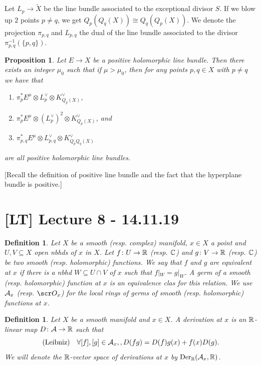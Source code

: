 \documentclass[A4paper, british, reqno]{amsart}
\theoremstyle{darkgreentheorem}
\newtheorem{prop}[thm]{Proposition}
\theoremstyle{darkbluedefinition}
\newtheorem{defn}[thm]{Definition}
\theoremstyle{darkredexample}
\theoremstyle{remark}
\DeclareMathOperator{\Der}{Der}
\newcommand{\1}{\mathbbm{1}}
\newcommand{\ot}{\otimes}
\newcommand{\dual}{^{\vee}}
\newcommand{\sub}{\subseteq}
\begin{document}
Let $L_{p}\to \tilde{X}$ be the line bundle associated to the exceptional divisor $S$.
If we blow up $2$ points $p\neq q$, we get $Q_{p}(Q_{q}(X))\cong Q_{q}(Q_{p}(X))$.
We denote the projection $\pi_{p,q}$ and $L_{p,q}$ the dual of the line bundle associated to the divisor $\pi_{p,q}^{-1}(\{p,q\})$.

\begin{prop}
    Let $E\to X$ be a positive holomorphic line bundle.
    Then there exists an integer $\mu_{0}$ such that if $\mu >\mu_{0}$, then for any points $p,q\in X$ with $p\neq q$ we have that
    \begin{enumerate}
	\item $\pi_{p}^{*}E^{\mu}\ot L_{p}\dual \ot K_{Q_{p}(X)}\dual $,
	\item $\pi_{p}^{*}E^{\mu}\ot (L_{p}\dual)^{2}\ot K_{Q_{p}(X)}\dual $, and
	\item $\pi_{p,q}^{*}E^{\mu}\ot L_{p,q}\dual \ot K_{Q_{p}Q_{q}(X)}\dual $
    \end{enumerate}
    are all positive holomorphic line bundles.
\end{prop}

[Recall the definition of positive line bundle and the fact that the hyperplane bundle is positive.]

\section{[LT] Lecture 8 - 14.11.19}

\begin{defn}
    Let $X$ be a smooth (resp. complex) manifold, $x\in X$ a point and $U,V\sub X$ open nbhds of $x$ in $X$.
    Let $f\colon U\to \mathbb{R}$ (resp. $\mathbb{C}$) and $g\colon V\to \mathbb{R}$ (resp. $\mathbb{C}$) be two smooth (resp. holomorphic) functions.
    We say that $f$ and $g$ are equivalent at $x$ if there is a nbhd $W\subseteq U\cap V$ of $x$ such that $f|_{W}=g|_{W}$.
    A \textit{germ of a smooth (resp. holomorphic) function} at $x$ is an equivalence clas for this relation.
    We use $\mathcal{A}_{x}$ (resp. $\O_{x}$) for the local rings of germs of smooth (resp. holomorphic) functions at $x$.
\end{defn}

\begin{defn}
    Let $X$ be a smooth manifold and $x\in X$.
    A \textit{derivation at $x$} is an $\mathbb{R}$-linear map $D\colon \mathcal{A}\to \mathbb{R}$ such that
    \[ \text{(Leibniz)} \quad \forall [f],[g]\in \mathcal{A}_{x},, D(fg)=D(f)g(x)+f(x)D(g).\]
    We will denote the $\mathbb{R}$-vector space of derivations at $x$ by $\Der_{\R}(\calA_{x},\R)$.
\end{defn}
\end{document}
